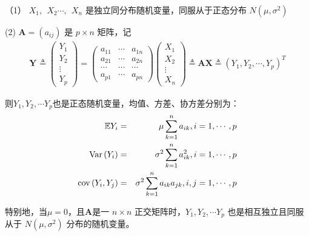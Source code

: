 	\begin{theorem}
		
	   （1） $ X_{1}, \ \ X_{2} \cdots,  \ \  X_{n} $ 是独立同分布随机变量，同服从于正态分布 $  N\left(\mu, \sigma^{2}\right)  $
		
		(2) $   \boldsymbol{A} = \left(a_{i j}\right)  $ 是  $ p \times n $  矩阵，记
		$$ 
		\begin{array}{l}
            \boldsymbol{Y_{ }} \triangleq\left(\begin{array}{l}
			Y_{1} \\
			Y_{2} \\
			\vdots \\
			Y_{p}
		\end{array}\right)=\left(\begin{array}{ccc}
			a_{11}  & \cdots &  a_{1 n}  \\
			a_{21}  & \cdots &  a_{2 n}  \\
			\cdots  & \cdots &  \cdots   \\
			a_{p 1} & \cdots &  a_{p n}
		\end{array}\right)\left(\begin{array}{l}
			X_{1}  \\    X_{2} \\
			\vdots \\     X_{n}
			\end{array}\right) \triangleq  \boldsymbol{A X } 
			\triangleq \left(Y_{1} , Y_{2}, \cdots , Y_{p}\right)^{T}
		\end{array} $$
	\end{theorem}
	
	则$ Y_{1},Y_{2},\cdots Y_{p} $也是正态随机变量，均值、方差、协方差分别为：
		\begin{eqnarray}
			\mathbb{E} Y_{i} & = &  \mu \sum_{k  =  1}^{n} a_{i k}, i = 1, \cdots, p \notag \\
			\operatorname{Var}\left(Y_{i}\right) & = & \sigma^{2} \sum_{k = 1}^{n} a_{i k}^{2}, i  =  1, \cdots, p \notag \\
			\operatorname{cov}\left(Y_{i}, Y_{j}\right) & = & \sigma^{2} \sum_{k  =  1}^{n} a_{i k} a_{j k}, i, j  =  1, \cdots, p \notag
		\end{eqnarray}
		
		特别地，当$ \mu = 0 $，且$ \boldsymbol{ A } $是一 $ n \times n$ 正交矩阵时，$ Y_{1},Y_{2},\cdots Y_{p} $
		也是相互独立且同服从于 $  N\left(\mu, \sigma^{2}\right)  $ 分布的随机变量。

